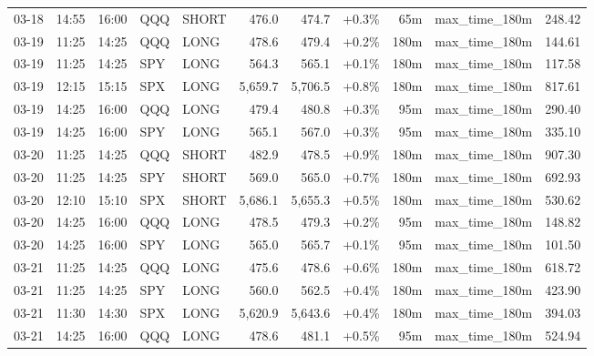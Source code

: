 \documentclass[11pt,a4paper,twoside]{article}
\begin{document}
\begin{center}
\begin{longtable}{>{\color{txtmain}}l l l l l r r r r >{\color{txtmain}}l r}
03-18 & 14:55 & 16:00 & QQQ & SHORT & 476.0 & 474.7 & \textcolor{wingreen}{+0.3\%} & 65m & max\_time\_180m & \textcolor{wingreen}{248.42} \\
03-19 & 11:25 & 14:25 & QQQ & LONG & 478.6 & 479.4 & \textcolor{wingreen}{+0.2\%} & 180m & max\_time\_180m & \textcolor{wingreen}{144.61} \\
03-19 & 11:25 & 14:25 & SPY & LONG & 564.3 & 565.1 & \textcolor{wingreen}{+0.1\%} & 180m & max\_time\_180m & \textcolor{wingreen}{117.58} \\
03-19 & 12:15 & 15:15 & SPX & LONG & 5,659.7 & 5,706.5 & \textcolor{wingreen}{+0.8\%} & 180m & max\_time\_180m & \textcolor{wingreen}{817.61} \\
03-19 & 14:25 & 16:00 & QQQ & LONG & 479.4 & 480.8 & \textcolor{wingreen}{+0.3\%} & 95m & max\_time\_180m & \textcolor{wingreen}{290.40} \\
03-19 & 14:25 & 16:00 & SPY & LONG & 565.1 & 567.0 & \textcolor{wingreen}{+0.3\%} & 95m & max\_time\_180m & \textcolor{wingreen}{335.10} \\
03-20 & 11:25 & 14:25 & QQQ & SHORT & 482.9 & 478.5 & \textcolor{wingreen}{+0.9\%} & 180m & max\_time\_180m & \textcolor{wingreen}{907.30} \\
03-20 & 11:25 & 14:25 & SPY & SHORT & 569.0 & 565.0 & \textcolor{wingreen}{+0.7\%} & 180m & max\_time\_180m & \textcolor{wingreen}{692.93} \\
03-20 & 12:10 & 15:10 & SPX & SHORT & 5,686.1 & 5,655.3 & \textcolor{wingreen}{+0.5\%} & 180m & max\_time\_180m & \textcolor{wingreen}{530.62} \\
03-20 & 14:25 & 16:00 & QQQ & LONG & 478.5 & 479.3 & \textcolor{wingreen}{+0.2\%} & 95m & max\_time\_180m & \textcolor{wingreen}{148.82} \\
03-20 & 14:25 & 16:00 & SPY & LONG & 565.0 & 565.7 & \textcolor{wingreen}{+0.1\%} & 95m & max\_time\_180m & \textcolor{wingreen}{101.50} \\
03-21 & 11:25 & 14:25 & QQQ & LONG & 475.6 & 478.6 & \textcolor{wingreen}{+0.6\%} & 180m & max\_time\_180m & \textcolor{wingreen}{618.72} \\
03-21 & 11:25 & 14:25 & SPY & LONG & 560.0 & 562.5 & \textcolor{wingreen}{+0.4\%} & 180m & max\_time\_180m & \textcolor{wingreen}{423.90} \\
03-21 & 11:30 & 14:30 & SPX & LONG & 5,620.9 & 5,643.6 & \textcolor{wingreen}{+0.4\%} & 180m & max\_time\_180m & \textcolor{wingreen}{394.03} \\
03-21 & 14:25 & 16:00 & QQQ & LONG & 478.6 & 481.1 & \textcolor{wingreen}{+0.5\%} & 95m & max\_time\_180m & \textcolor{wingreen}{524.94} \\

\end{longtable}
\end{center}
\end{document}
